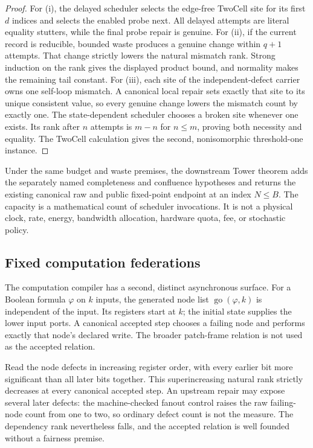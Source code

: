 \documentclass[11pt]{article}
\theoremstyle{definition}
\theoremstyle{remark}
\numberwithin{equation}{section}
\begin{document}
\begin{proof}
For (i), the delayed scheduler selects the edge-free TwoCell site for its
first \(d\) indices and selects the enabled probe next.  All delayed attempts
are literal equality stutters, while the final probe repair is genuine.
For (ii), if the current record is reducible, bounded waste produces a genuine
change within \(q+1\) attempts.  That change strictly lowers the natural
mismatch rank.  Strong induction on the rank gives the displayed product
bound, and normality makes the remaining tail constant.  For (iii), each site
of the independent-defect carrier owns one self-loop mismatch.  A canonical
local repair sets exactly that site to its unique consistent value, so every
genuine change lowers the mismatch count by exactly one.  The state-dependent
scheduler chooses a broken site whenever one exists.  Its rank after \(n\)
attempts is \(m-n\) for \(n\le m\), proving both necessity and equality.  The
TwoCell calculation gives the second, nonisomorphic threshold-one instance.
\end{proof}

Under the same budget and waste premises, the downstream Tower theorem adds
the separately named completeness and confluence hypotheses and returns the
existing canonical raw and public fixed-point endpoint at an index
\(N\le B\).  The capacity is a mathematical count of scheduler invocations.
It is not a physical clock, rate, energy, bandwidth allocation, hardware
quota, fee, or stochastic policy.

\subsection{Fixed computation federations}

The computation compiler has a second, distinct asynchronous surface.  For a
Boolean formula \(\varphi\) on \(k\) inputs, the generated node list
\(\operatorname{go}(\varphi,k)\) is independent of the input.  Its registers
start at \(k\); the initial state supplies the lower input ports.  A canonical
accepted step chooses a failing node and performs exactly that node's declared
write.  The broader patch-frame relation is not used as the accepted
relation.

Read the node defects in increasing register order, with every earlier bit
more significant than all later bits together.  This superincreasing natural
rank strictly decreases at every canonical accepted step.  An upstream repair
may expose several later defects: the machine-checked fanout control raises
the raw failing-node count from one to two, so ordinary defect count is not the
measure.  The dependency rank nevertheless falls, and the accepted relation
is well founded without a fairness premise.
\end{document}
